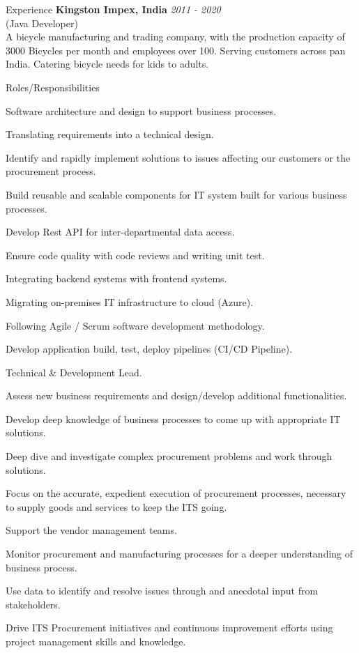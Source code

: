 \documentclass{resume}
\begin{document}
\begin{rSection}{Experience}
{\bf Kingston Impex, India} \hfill {\em  2011 - 2020} 
\\(Java Developer)
\\A bicycle manufacturing and trading company, with the production capacity of 3000 Bicycles per month and employees over 100. Serving customers across pan India. Catering bicycle needs for kids to adults.

\begin{rSubsection}{Roles/Responsibilities}{}{}{}
\item Software architecture and design to support business processes.
\item Translating requirements into a technical design.
\item Identify and rapidly implement solutions to issues affecting our customers or the procurement process.
\item Build reusable and scalable components for IT system built for various business processes.
\item Develop Rest API for inter-departmental data access.
\item Ensure code quality with code reviews and writing unit test.
\item Integrating backend systems with frontend systems.
\item Migrating on-premises IT infrastructure to cloud (Azure).
\item Following Agile / Scrum software development methodology.
\item Develop application build, test, deploy pipelines (CI/CD Pipeline).
\item Technical \& Development Lead.
\item Assess new business requirements and design/develop additional functionalities.
\item Develop deep knowledge of business processes to come up with appropriate IT solutions. 
\item Deep dive and investigate complex procurement problems and work through solutions.
\item Focus on the accurate, expedient execution of procurement processes, necessary to supply goods and services to keep the ITS going.
\item Support the vendor management teams.
\item Monitor procurement and manufacturing processes for a deeper understanding of business process.
\item Use data to identify and resolve issues through and anecdotal input from stakeholders.
\item Drive ITS Procurement initiatives and continuous improvement efforts using project management skills and knowledge.
\end{rSubsection}


\end{rSection}
\end{document}
